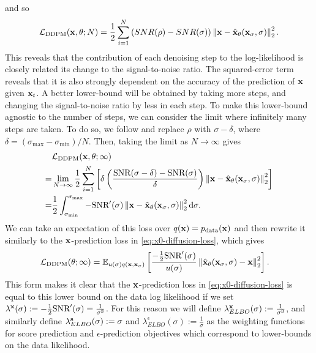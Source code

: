 and so
\begin{align}
    \mathcal{L}_\text{DDPM}({\mathbf{x}}, \theta; N) = \frac{1}{2} \sum_{i=1}^N \left( SNR(\rho) - SNR(\sigma) \right) \left\| {\mathbf{x}} - \hat{{\mathbf{x}}}_\theta({\mathbf{x}}_\sigma, \sigma) \right\|_2^2.
\end{align}
This reveals that the contribution of each denoising step to the log-likelihood is closely related its change to the signal-to-noise ratio. The squared-error term reveals that it is also strongly dependent on the accuracy of the prediction of ${\mathbf{x}}$ given ${\mathbf{x}}_t$. A better lower-bound will be obtained by taking more steps, and changing the signal-to-noise ratio by less in each step. To make this lower-bound agnostic to the number of steps, we can consider the limit where infinitely many steps are taken. To do so, we  follow \citet{kingma2021variational} and replace $\rho$ with $\sigma-\delta$, where $\delta = (\sigma_\text{max}-\sigma_\text{min}) / N$. Then, taking the limit as $N \rightarrow \infty$ gives 
\begin{align}
    &\mathcal{L}_\text{DDPM}({\mathbf{x}}, \theta; \infty) \\
    = &\lim_{N\rightarrow\infty}  \frac{1}{2} \sum_{i=1}^N \left[ \delta \left( \frac{\text{SNR}(\sigma-\delta) - \text{SNR}(\sigma)}{\delta} \right) \left\| {\mathbf{x}} - \hat{{\mathbf{x}}}_\theta({\mathbf{x}}_\sigma, \sigma) \right\|_2^2 \right] \\
    = &\frac{1}{2} \int_{\sigma_\text{min}}^{\sigma_\text{max}} -\text{SNR}'(\sigma) \left\| {\mathbf{x}} - \hat{{\mathbf{x}}}_\theta({\mathbf{x}}_\sigma, \sigma) \right\|_2^2 \mathrm{d}\sigma \label{eq:diffusion-elbo}.
\end{align}
We can take an expectation of this loss over $q({\mathbf{x}})=p_{\rm{data}}({\mathbf{x}})$ and then rewrite it similarly to the ${\mathbf{x}}$-prediction loss in \cref{eq:x0-diffusion-loss}, which gives
\begin{align} \label{eq:diffusion-loss-likelihood}
    \mathcal{L}_\text{DDPM}(\theta; \infty) &= \mathbb{E}_{u(\sigma)q({\mathbf{x}}, {\mathbf{x}}_\sigma)} \left[ 
    \frac{-\frac{1}{2}\text{SNR}'(\sigma)}{u(\sigma)}
    \left\| \hat{{\mathbf{x}}}_\theta({\mathbf{x}}_\sigma, \sigma) - {\mathbf{x}} \right\|_2^2 \right].
\end{align}
This form makes it clear that the ${\mathbf{x}}$-prediction loss in \cref{eq:x0-diffusion-loss} is equal to this lower bound on the data log likelihood if we set $\lambda^{\mathbf{x}}(\sigma) := - \frac{1}{2} \text{SNR}'(\sigma) = \frac{1}{\sigma^3}$. For this reason we will define $\lambda^{\mathbf{x}}_{ELBO}(\sigma) := \frac{1}{\sigma^3}$, and similarly define $\lambda^{\mathbf{s}}_{ELBO}(\sigma) := \sigma$ and $\lambda^\epsilon_{ELBO}(\sigma) := \frac{1}{\sigma}$ as the weighting functions for score prediction and $\epsilon$-prediction objectives which correspond to lower-bounds on the data likelihood.

